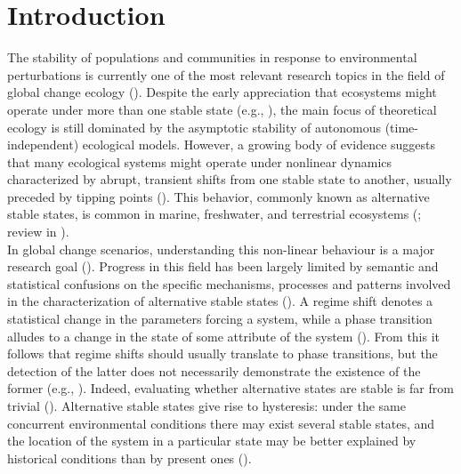 \documentclass[12pt]{article}
\begin{document}

\newpage

\onehalfspacing

\section*{Introduction}
\label{sec:Introduction}

The stability of populations and communities in response to environmental perturbations is currently one of the most relevant research topics in the field of global change ecology (\cite{Bjornstad2001,Post2013,Vellend2016,Yang2019}). Despite the early appreciation that ecosystems might operate under more than one stable state (e.g., \cite{Holling1973,May1976a}), the main focus of theoretical ecology is still dominated by the asymptotic stability of autonomous (time-independent) ecological models. However, a growing body of evidence suggests that many ecological systems might operate under nonlinear dynamics characterized by abrupt, transient shifts from one stable state to another, usually preceded by tipping points (\cite{Fukami2011,Petraitis2013,Yletyinen2016,Rocha2018,Clements2018a,Dakos2019,Chen2020a}). This behavior, commonly known as alternative stable states, is common in marine, freshwater, and terrestrial ecosystems (\cite{Steele1996,Knowlton2004,Capon2015,Gsell2016a}; review in \cite{Rocha2015}).\\

In global change scenarios, understanding this non-linear behaviour is a major research goal (\cite{Rockstrom2009,Barnosky2012,Steffen2015a,Nash2017}). Progress in this field has been largely limited by semantic and statistical confusions on the specific mechanisms, processes and patterns involved in the characterization of alternative stable states (\cite{Suding2004a,Capon2015,Kuiper2015}). A regime shift denotes a statistical change in the parameters forcing a system, while a phase transition alludes to a change in the state of some attribute of the system (\cite{Scheffer2009a}). From this it follows that regime shifts should usually translate to phase transitions, but the detection of the latter does not necessarily demonstrate the existence of the former (e.g., \cite{Rudnick2003}). Indeed, evaluating whether alternative states are stable is far from trivial (\cite{Scheffer2009a,Stelzer2021}). Alternative stable states give rise to hysteresis: under the same concurrent environmental conditions there may exist several stable states, and the location of the system in a particular state may be better explained by historical conditions than by present ones (\cite{Scheffer2009a,Clements2018a}).\\
\end{document}

